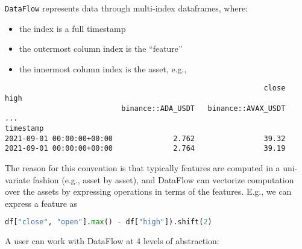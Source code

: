 \documentclass[11pt, reqno]{amsart}
\theoremstyle{definition}
\theoremstyle{remark}
\begin{document}
  \verb|DataFlow| represents data through multi-index dataframes, where:

  \begin{itemize}
    \item the index is a full timestamp

    \item the outermost column index is the ``feature''

    \item the innermost column index is the asset, e.g.,
  \end{itemize}

  \begin{verbatim}
                                                            close           high
                           binance::ADA_USDT   binance::AVAX_USDT            ...
timestamp
2021-09-01 00:00:00+00:00              2.762                39.32
2021-09-01 00:00:00+00:00              2.764                39.19
\end{verbatim}

  The reason for this convention is that typically features are computed in a
  uni-variate fashion (e.g., asset by asset), and DataFlow can vectorize computation
  over the assets by expressing operations in terms of the features. E.g., we
  can express a feature as

  \begin{lstlisting}[language=Python]
df["close", "open"].max() - df["high"]).shift(2)
\end{lstlisting}

  A user can work with DataFlow at 4 levels of abstraction:
\end{document}
